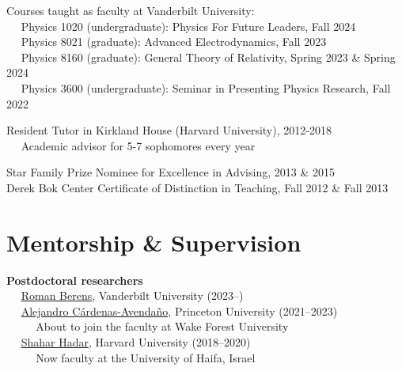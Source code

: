 \documentclass[margin,line]{resume}
\begin{document}
\begin{resume}
Courses taught as faculty at Vanderbilt University: \\
	\mbox{ }\mbox{ } Physics 1020 (undergraduate): Physics For Future Leaders, Fall 2024 \\
	\mbox{ }\mbox{ } Physics 8021 (graduate): Advanced Electrodynamics, Fall 2023 \\
	\mbox{ }\mbox{ } Physics 8160 (graduate): General Theory of Relativity, Spring 2023 \& Spring 2024 \\
	\mbox{ }\mbox{ } Physics 3600 (undergraduate): Seminar in Presenting Physics Research, Fall 2022

Resident Tutor in Kirkland House (Harvard University), 2012-2018 \\
	\mbox{ }\mbox{ } Academic advisor for 5-7 sophomores every year

	Star Family Prize Nominee for Excellence in Advising, 2013 \& 2015 \\
	Derek Bok Center Certificate of Distinction in Teaching, Fall 2012 \& Fall 2013
	\vspace{-1mm}

\section{\mysidestyle Mentorship \& Supervision}

\textbf{Postdoctoral researchers} \\
	\mbox{ }\mbox{ } \href{https://www.romanberens.com/}{Roman Berens}, Vanderbilt University (2023--)
	\vspace{2mm} \\
	\mbox{ }\mbox{ } \href{https://cardenas.sites.wfu.edu/about-me/}{Alejandro C\'ardenas-Avenda\~no}, Princeton University (2021--2023) \\
	\mbox{ }\mbox{ } \mbox{ }\mbox{ } About to join the faculty at Wake Forest University
	\vspace{2mm} \\
	\mbox{ }\mbox{ } \href{https://cris.haifa.ac.il/en/persons/shahar-hadar}{Shahar Hadar}, Harvard University (2018--2020) \\
	\mbox{ }\mbox{ } \mbox{ }\mbox{ } Now faculty at the University of Haifa, Israel


\end{resume}
\end{document}
